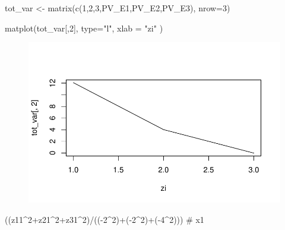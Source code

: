 \documentclass[
  letterpaper,
  DIV=11,
  numbers=noendperiod]{scrartcl}
\newenvironment{Shaded}{\begin{snugshade}}{\end{snugshade}}
\newcommand{\AttributeTok}[1]{\textcolor[rgb]{0.40,0.45,0.13}{#1}}
\newcommand{\CommentTok}[1]{\textcolor[rgb]{0.37,0.37,0.37}{#1}}
\newcommand{\DecValTok}[1]{\textcolor[rgb]{0.68,0.00,0.00}{#1}}
\newcommand{\FunctionTok}[1]{\textcolor[rgb]{0.28,0.35,0.67}{#1}}
\newcommand{\NormalTok}[1]{\textcolor[rgb]{0.00,0.23,0.31}{#1}}
\newcommand{\OtherTok}[1]{\textcolor[rgb]{0.00,0.23,0.31}{#1}}
\newcommand{\SpecialCharTok}[1]{\textcolor[rgb]{0.37,0.37,0.37}{#1}}
\newcommand{\StringTok}[1]{\textcolor[rgb]{0.13,0.47,0.30}{#1}}
\begin{document}
\begin{Shaded}
\begin{Highlighting}[]
\NormalTok{tot\_var }\OtherTok{\textless{}{-}} \FunctionTok{matrix}\NormalTok{(}\FunctionTok{c}\NormalTok{(}\DecValTok{1}\NormalTok{,}\DecValTok{2}\NormalTok{,}\DecValTok{3}\NormalTok{,PV\_E1,PV\_E2,PV\_E3), }\AttributeTok{nrow=}\DecValTok{3}\NormalTok{)}
\end{Highlighting}
\end{Shaded}

\begin{Shaded}
\begin{Highlighting}[]
\FunctionTok{matplot}\NormalTok{(tot\_var[,}\DecValTok{2}\NormalTok{], }\AttributeTok{type=}\StringTok{"l"}\NormalTok{, }\AttributeTok{xlab =} \StringTok{"zi"}
\NormalTok{        )}
\end{Highlighting}
\end{Shaded}

\begin{figure}[H]

{\centering \includegraphics{excercise_doc_files/figure-pdf/unnamed-chunk-40-1.pdf}

}

\end{figure}

\begin{Shaded}
\begin{Highlighting}[]
\NormalTok{((z11}\SpecialCharTok{\^{}}\DecValTok{2}\SpecialCharTok{+}\NormalTok{z21}\SpecialCharTok{\^{}}\DecValTok{2}\SpecialCharTok{+}\NormalTok{z31}\SpecialCharTok{\^{}}\DecValTok{2}\NormalTok{)}\SpecialCharTok{/}\NormalTok{((}\SpecialCharTok{{-}}\DecValTok{2}\SpecialCharTok{\^{}}\DecValTok{2}\NormalTok{)}\SpecialCharTok{+}\NormalTok{(}\SpecialCharTok{{-}}\DecValTok{2}\SpecialCharTok{\^{}}\DecValTok{2}\NormalTok{)}\SpecialCharTok{+}\NormalTok{(}\SpecialCharTok{{-}}\DecValTok{4}\SpecialCharTok{\^{}}\DecValTok{2}\NormalTok{))) }\CommentTok{\# x1}
\end{Highlighting}
\end{Shaded}
\end{document}
